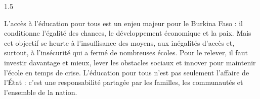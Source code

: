 \documentclass[12pt]{article}
\begin{document}
\begin{spacing}{1.5}

L'accès à l'éducation pour tous est un enjeu majeur pour le Burkina Faso : il conditionne l'égalité des chances, le développement économique et la paix. Mais cet objectif se heurte à l'insuffisance des moyens, aux inégalités d'accès et, surtout, à l'insécurité qui a fermé de nombreuses écoles. Pour le relever, il faut investir davantage et mieux, lever les obstacles sociaux et innover pour maintenir l'école en temps de crise. L'éducation pour tous n'est pas seulement l'affaire de l'État : c'est une responsabilité partagée par les familles, les communautés et l'ensemble de la nation.

\end{spacing}
\end{document}
